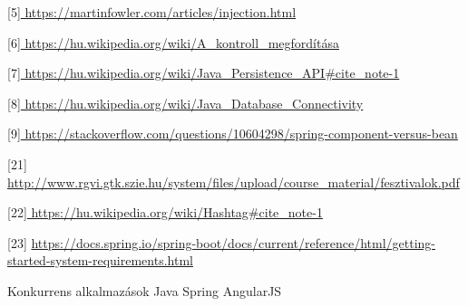\documentclass[11pt]{article}
\begin{document}
[5]\url{ https://martinfowler.com/articles/injection.html }

[6]\url{ https://hu.wikipedia.org/wiki/A_kontroll_megfordítása }

[7]\url{ https://hu.wikipedia.org/wiki/Java_Persistence_API#cite_note-1 }

[8]\url{ https://hu.wikipedia.org/wiki/Java_Database_Connectivity }

[9]\url{ https://stackoverflow.com/questions/10604298/spring-component-versus-bean }

[21]\url{ http://www.rgvi.gtk.szie.hu/system/files/upload/course_material/fesztivalok.pdf }

[22]\url{ https://hu.wikipedia.org/wiki/Hashtag#cite_note-1 }

[23] \url{ https://docs.spring.io/spring-boot/docs/current/reference/html/getting-started-system-requirements.html }

Konkurrens alkalmazások
Java Spring
AngularJS
\end{document}
